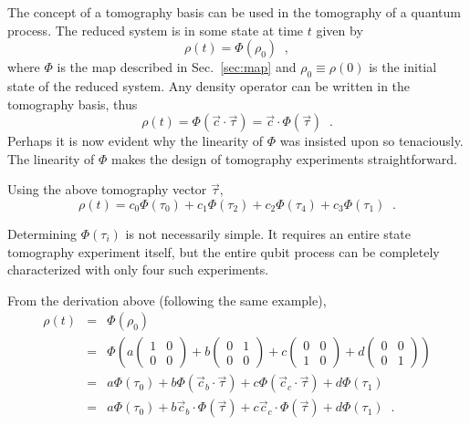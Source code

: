 The concept of a tomography basis can be used in the tomography of a quantum process.  The reduced system is in some state at time $t$ given by
$$
\rho(t) = \Phi(\rho_0)\;\;,
$$
where $\Phi$ is the map described in Sec.\ \ref{sec:map} and $\rho_0\equiv\rho(0)$ is the initial state of the reduced system.  Any density operator can be written in the tomography basis, thus
$$
\rho(t) = \Phi(\vec{c}\cdot\vec{\tau}) = \vec{c}\cdot\Phi(\vec{\tau})\;\;.
$$
Perhaps it is now evident why the linearity of $\Phi$ was insisted upon so tenaciously.  The linearity of $\Phi$ makes the design of tomography experiments straightforward.  
\begin{example}
Using the above tomography vector $\vec{\tau}$,
$$
\rho(t) = c_0\Phi(\tau_0)+c_1\Phi(\tau_2)+c_2\Phi(\tau_4)+c_3\Phi(\tau_1)\;\;.
$$
\end{example}

Determining $\Phi(\tau_i)$ is not necessarily simple.  It requires an entire state tomography experiment itself, but the entire qubit process can be completely characterized with only four such experiments.  
\begin{example}
From the derivation above (following the same example),
\begin{eqnarray*}
\rho(t) &=& \Phi(\rho_0)\\
&=& \Phi\left(a\begin{pmatrix}
1 & 0\\
0 & 0
\end{pmatrix}+b\begin{pmatrix}
0 & 1\\
0 & 0
\end{pmatrix}+c\begin{pmatrix}
0 & 0\\
1 & 0
\end{pmatrix}+d\begin{pmatrix}
0 & 0\\
0 & 1
\end{pmatrix}\right)\\
&=& a\Phi(\tau_0) + b\Phi(\vec{c}_b\cdot\vec{\tau}) + c\Phi(\vec{c}_c\cdot\vec{\tau}) + d\Phi(\tau_1)\\
&=& a\Phi(\tau_0) + b\vec{c}_b\cdot\Phi(\vec{\tau}) + c\vec{c}_c\cdot\Phi(\vec{\tau}) + d\Phi(\tau_1)\;\;.
\end{eqnarray*}
\end{example}

